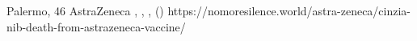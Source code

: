           {Palermo, }
          {46}
          {AstraZeneca}
          {}
          {
            ,
            ,
            ,
             ()
          }
          {https://nomoresilence.world/astra-zeneca/cinzia-nib-death-from-astrazeneca-vaccine/}

